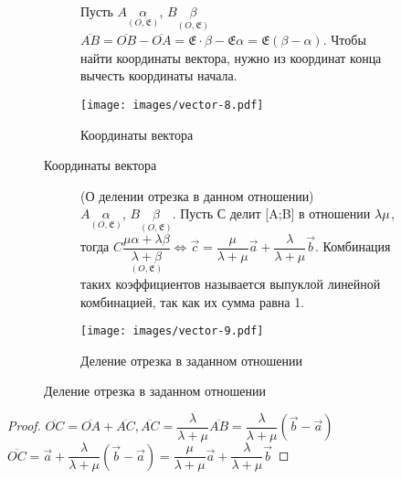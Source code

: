 \vspace{3mm}
\begin{figure}[h]
\begin{subfigure}[t!]{0.6\linewidth}
	\begin{proposition}
		Пусть \(A\underset{(O, \mathfrak{E})}{\alpha}\), \(B\underset{(O, \mathfrak{E})}{\beta}\) \\
		$\overline{AB} = \overline{OB} - \overline{OA} = \mathfrak{E}\cdot \beta - \mathfrak{E}\alpha = \mathfrak{E}(\beta - \alpha)$. Чтобы найти координаты вектора, нужно из координат конца вычесть координаты начала.
	\end{proposition}
\end{subfigure}
\begin{subfigure}[b!]{0.4\linewidth}
	\centering
	\texttt{[image: images/vector-8.pdf]}
	\caption*{Координаты вектора}
	\label{Vector8}
\end{subfigure}
\end{figure}
\begin{figure}[h]
\begin{subfigure}[t!]{0.6\linewidth}
	\begin{proposition}
		(О делении отрезка в данном отношении) \\
		\(A\underset{(O, \mathfrak{E})}{\alpha}\), \(B\underset{(O, \mathfrak{E})}{\beta}\). Пусть С делит [A;B] в отношении \(\lambda \\ \mu\), тогда \(C\underset{(O,\mathfrak{E})}{\dfrac{\mu\alpha+\lambda\beta}{\lambda + \beta}}\Longleftrightarrow \vec{c} = \dfrac{\mu}{\lambda+\mu}\vec{a}+\dfrac{\lambda}{\lambda+\mu}\vec{b}\). Комбинация таких коэффициентов называется выпуклой линейной комбинацией, так как их сумма равна 1.
	\end{proposition}
\end{subfigure}
\begin{subfigure}[b!]{0.4\linewidth}
	\centering
	\texttt{[image: images/vector-9.pdf]}
	\caption*{Деление отрезка в заданном отношении}
	\label{Vector9}
\end{subfigure}
\end{figure}
\begin{proof}
$\overline{OC} = \overline{OA}+\overline{AC}, \overline{AC} = \dfrac{\lambda}{\lambda+\mu}\overline{AB}=\dfrac{\lambda}{\lambda+\mu}(\vec{b} - \vec{a})$
\(\overline{OC} = \vec{a}+\dfrac{\lambda}{\lambda+\mu}(\vec{b} - \vec{a}) = \dfrac{\mu}{\lambda+\mu}\vec{a} + \dfrac{\lambda}{\lambda+\mu}\vec{b}\)
\end{proof}
